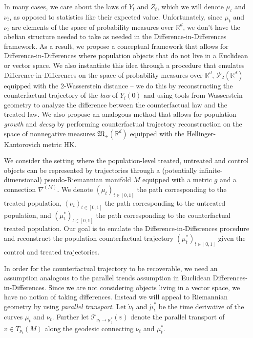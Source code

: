 \documentclass[11pt]{article}
\newcommand{\man}{M}
\begin{document}
In many cases, we care about the laws of $Y_t$ and $Z_t$, which we will denote $\mu_t$ and $\nu_t$, as opposed to statistics like their expected value. Unfortunately, since $\mu_t$ and $\nu_t$ are elements of the space of probability measures over $\mathbb{R}^d$, we don't have the abelian structure needed to take  as needed in the Difference-in-Differences framework. As a result, we propose a conceptual framework that allows for Difference-in-Differences where population objects that do not live in a Euclidean or vector space. We also instantiate this idea through a procedure that emulates Difference-in-Differences on the space of probability measures over $\mathbb{R}^d$, $\mathcal{P}_2(\mathbb{R}^d)$ equipped with the 2-Wasserstein distance -- we do this by reconstructing the counterfactual trajectory of the \textit{law} of $Y_i(0)$ and using tools from Wasserstein geometry to analyze the difference between the counterfactual law and the treated law. We also propose an analogous method that allows for population \textit{growth} and \textit{decay} by performing counterfactual trajectory reconstruction on the space of nonnegative measures $\mathfrak{M}_+(\mathbb{R}^d)$ equipped with the Hellinger-Kantorovich metric HK. 

We consider the setting where the population-level treated, untreated and control objects can be represented by trajectories through a (potentially infinite-dimensional) pseudo-Riemannian manifold $\man$ equipped with a metric $g$ and a connection $\nabla^{(\man)}$. We denote $(\mu_t)_{t \in [0,1]}$ the path corresponding to the treated population, $(\nu_t)_{t\in [0,1]}$ the path corresponding to the untreated population, and $(\mu_t^*)_{t \in [0,1]}$ the path corresponding to the counterfactual treated population. Our goal is to emulate the Difference-in-Differences procedure and reconstruct the population counterfactual trajectory $(\mu_t^*)_{t \in [0,1]}$ given the control and treated trajectories. 

In order for the counterfactual trajectory to be recoverable, we need an assumption analogous to the parallel trends assumption in Euclidean Differences-in-Differences. Since we are not considering objects living in a vector space, we have no notion of taking differences. Instead we will appeal to Riemannian geometry by using \textit{parallel transport}. Let $\dot \nu_t$ and $\dot \mu_t^*$ be the time derivative of the curves $\mu_t$ and $\nu_t$. Further let $\mathcal{T}_{\nu_t \rightarrow \mu_t^*}(v)$ denote the parallel transport of $v \in T_{\nu_t}(\man)$ along the geodesic connecting $\nu_t$ and $\mu_t^*$.
\end{document}
